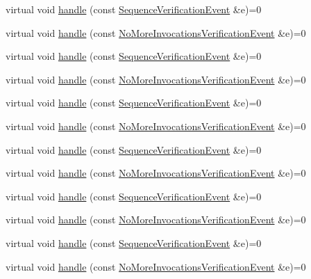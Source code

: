 \begin{DoxyCompactItemize}
\item 
virtual void \mbox{\hyperlink{structfakeit_1_1EventHandler_adf355a9888bc2bf78ce0e1219bfb1379}{handle}} (const \mbox{\hyperlink{structfakeit_1_1SequenceVerificationEvent}{Sequence\+Verification\+Event}} \&e)=0
\item 
virtual void \mbox{\hyperlink{structfakeit_1_1EventHandler_a826b9d15e23bad7013b219d8e45ef1d0}{handle}} (const \mbox{\hyperlink{structfakeit_1_1NoMoreInvocationsVerificationEvent}{No\+More\+Invocations\+Verification\+Event}} \&e)=0
\item 
virtual void \mbox{\hyperlink{structfakeit_1_1EventHandler_adf355a9888bc2bf78ce0e1219bfb1379}{handle}} (const \mbox{\hyperlink{structfakeit_1_1SequenceVerificationEvent}{Sequence\+Verification\+Event}} \&e)=0
\item 
virtual void \mbox{\hyperlink{structfakeit_1_1EventHandler_a826b9d15e23bad7013b219d8e45ef1d0}{handle}} (const \mbox{\hyperlink{structfakeit_1_1NoMoreInvocationsVerificationEvent}{No\+More\+Invocations\+Verification\+Event}} \&e)=0
\item 
virtual void \mbox{\hyperlink{structfakeit_1_1EventHandler_adf355a9888bc2bf78ce0e1219bfb1379}{handle}} (const \mbox{\hyperlink{structfakeit_1_1SequenceVerificationEvent}{Sequence\+Verification\+Event}} \&e)=0
\item 
virtual void \mbox{\hyperlink{structfakeit_1_1EventHandler_a826b9d15e23bad7013b219d8e45ef1d0}{handle}} (const \mbox{\hyperlink{structfakeit_1_1NoMoreInvocationsVerificationEvent}{No\+More\+Invocations\+Verification\+Event}} \&e)=0
\item 
virtual void \mbox{\hyperlink{structfakeit_1_1EventHandler_adf355a9888bc2bf78ce0e1219bfb1379}{handle}} (const \mbox{\hyperlink{structfakeit_1_1SequenceVerificationEvent}{Sequence\+Verification\+Event}} \&e)=0
\item 
virtual void \mbox{\hyperlink{structfakeit_1_1EventHandler_a826b9d15e23bad7013b219d8e45ef1d0}{handle}} (const \mbox{\hyperlink{structfakeit_1_1NoMoreInvocationsVerificationEvent}{No\+More\+Invocations\+Verification\+Event}} \&e)=0
\item 
virtual void \mbox{\hyperlink{structfakeit_1_1EventHandler_adf355a9888bc2bf78ce0e1219bfb1379}{handle}} (const \mbox{\hyperlink{structfakeit_1_1SequenceVerificationEvent}{Sequence\+Verification\+Event}} \&e)=0
\item 
virtual void \mbox{\hyperlink{structfakeit_1_1EventHandler_a826b9d15e23bad7013b219d8e45ef1d0}{handle}} (const \mbox{\hyperlink{structfakeit_1_1NoMoreInvocationsVerificationEvent}{No\+More\+Invocations\+Verification\+Event}} \&e)=0
\item 
virtual void \mbox{\hyperlink{structfakeit_1_1EventHandler_adf355a9888bc2bf78ce0e1219bfb1379}{handle}} (const \mbox{\hyperlink{structfakeit_1_1SequenceVerificationEvent}{Sequence\+Verification\+Event}} \&e)=0
\item 
virtual void \mbox{\hyperlink{structfakeit_1_1EventHandler_a826b9d15e23bad7013b219d8e45ef1d0}{handle}} (const \mbox{\hyperlink{structfakeit_1_1NoMoreInvocationsVerificationEvent}{No\+More\+Invocations\+Verification\+Event}} \&e)=0
\end{DoxyCompactItemize}


